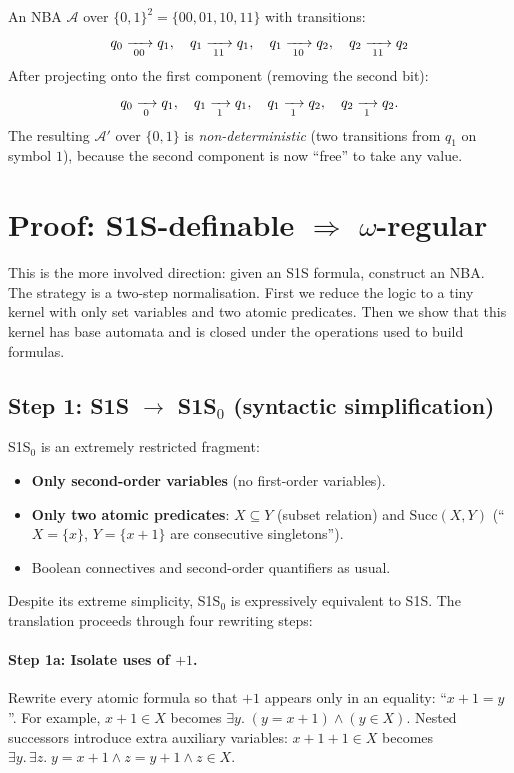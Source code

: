 \begin{example}
An NBA $\mathcal{A}$ over $\{0,1\}^2 = \{00, 01, 10, 11\}$ with transitions:
\[
  q_0 \xrightarrow[{\;00\;}]{} q_1, \quad
  q_1 \xrightarrow[{\;11\;}]{} q_1, \quad
  q_1 \xrightarrow[{\;10\;}]{} q_2, \quad
  q_2 \xrightarrow[{\;11\;}]{} q_2
\]
After projecting onto the first component (removing the second bit):
\[
  q_0 \xrightarrow[{\;0\;}]{} q_1, \quad
  q_1 \xrightarrow[{\;1\;}]{} q_1, \quad
  q_1 \xrightarrow[{\;1\;}]{} q_2, \quad
  q_2 \xrightarrow[{\;1\;}]{} q_2.
\]
The resulting $\mathcal{A}'$ over $\{0,1\}$ is \emph{non-deterministic}
(two transitions from $q_1$ on symbol $1$), because the second component
is now ``free'' to take any value.
\end{example}

\section{Proof: S1S-definable \texorpdfstring{$\Rightarrow$}{=>} \texorpdfstring{$\omega$-regular}{omega-regular}}
\label{sec:buchi-proof-bwd}

This is the more involved direction: given an S1S formula, construct an
NBA.  The strategy is a two-step normalisation.
First we reduce the logic to a tiny kernel with only set variables and two
atomic predicates.  Then we show that this kernel has base automata and is
closed under the operations used to build formulas.

\subsection{Step 1: S1S $\to$ S1S$_0$ (syntactic simplification)}

S1S$_0$ is an extremely restricted fragment:
\begin{itemize}
  \item \textbf{Only second-order variables} (no first-order variables).
  \item \textbf{Only two atomic predicates}: $X \subseteq Y$ (subset
        relation) and $\mathrm{Succ}(X, Y)$ (``$X = \{x\}$, $Y = \{x+1\}$
        are consecutive singletons'').
  \item Boolean connectives and second-order quantifiers as usual.
\end{itemize}

Despite its extreme simplicity, S1S$_0$ is expressively equivalent to S1S.
The translation proceeds through four rewriting steps:

\paragraph{Step 1a: Isolate uses of $+1$.}
Rewrite every atomic formula so that $+1$ appears only in an equality:
``$x+1 = y$''.  For example, $x+1 \in X$ becomes $\exists y.\;(y = x+1)
\land (y \in X)$.  Nested successors introduce extra auxiliary variables:
$x+1+1 \in X$ becomes $\exists y.\,\exists z.\;y = x+1 \land z = y+1
\land z \in X$.

